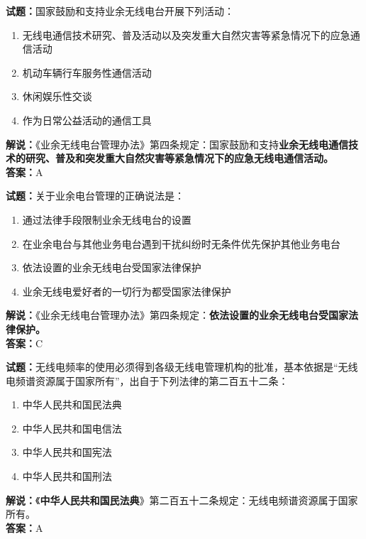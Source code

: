 \documentclass{ctexbook}
\begin{document}
\vspace{1em}

\textbf{试题：}国家鼓励和支持业余无线电台开展下列活动：
\begin{enumerate}[leftmargin=3em]
  \item 无线电通信技术研究、普及活动以及突发重大自然灾害等紧急情况下的应急通信活动
  \item 机动车辆行车服务性通信活动
  \item 休闲娱乐性交谈
  \item 作为日常公益活动的通信工具
\end{enumerate}
\noindent\textbf{解说：}《业余无线电台管理办法》第四条规定：国家鼓励和支持\textbf{业余无线电通信技术的研究、普及和突发重大自然灾害等紧急情况下的应急无线电通信活动。}\\\noindent\textbf{答案：}A

\vspace{1em}

\textbf{试题：}关于业余电台管理的正确说法是：
\begin{enumerate}[leftmargin=3em]
  \item 通过法律手段限制业余无线电台的设置
  \item 在业余电台与其他业务电台遇到干扰纠纷时无条件优先保护其他业务电台
  \item 依法设置的业余无线电台受国家法律保护
  \item 业余无线电爱好者的一切行为都受国家法律保护
\end{enumerate}
\noindent\textbf{解说：}《业余无线电台管理办法》第四条规定：\textbf{依法设置的业余无线电台受国家法律保护。}\\\noindent\textbf{答案：}C

\vspace{1em}

\textbf{试题：}无线电频率的使用必须得到各级无线电管理机构的批准，基本依据是“无线电频谱资源属于国家所有”，出自于下列法律的第二百五十二条：
\begin{enumerate}[leftmargin=3em]
  \item 中华人民共和国民法典
  \item 中华人民共和国电信法
  \item 中华人民共和国宪法
  \item 中华人民共和国刑法
\end{enumerate}
\noindent\textbf{解说：}《\textbf{中华人民共和国民法典}》第二百五十二条规定：无线电频谱资源属于国家所有。\\\noindent\textbf{答案：}A
\end{document}
